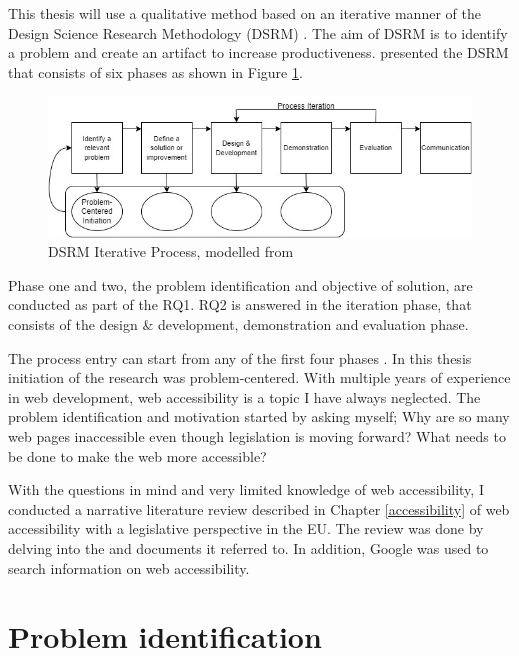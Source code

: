 This thesis will use a qualitative method based on an iterative manner of the Design Science Research Methodology (DSRM) \citep{designsciencemethodology, iterativedesignscience}. The aim of DSRM is to identify a problem and create an artifact to increase productiveness. \textcite{iterativedesignscience} presented the DSRM that consists of six phases as shown in Figure \ref{fig:design-science}.

\begin{figure}
    \centering
    \includegraphics[width=1\linewidth]{image.png}
    \caption{DSRM Iterative Process, modelled from \textcite{iterativedesignscience}}
    \label{fig:design-science}
\end{figure}

Phase one and two, the problem identification and objective of solution, are conducted as part of the RQ1. RQ2 is answered in the iteration phase, that consists of the design \& development, demonstration and evaluation phase.

The process entry can start from any of the first four phases \citep{iterativedesignscience}. In this thesis initiation of the research was problem-centered. With multiple years of experience in web development, web accessibility is a topic I have always neglected. The problem identification and motivation started by asking myself; Why are so many web pages inaccessible even though legislation is moving forward? What needs to be done to make the web more accessible? 

With the questions in mind and very limited knowledge of web accessibility, I conducted a narrative literature review described in Chapter \ref{accessibility} of web accessibility with a legislative perspective in the EU. The review was done by delving into the \textcite{eudirective2016} and documents it referred to. In addition, Google was used to search information on web accessibility.

\section{Problem identification}

